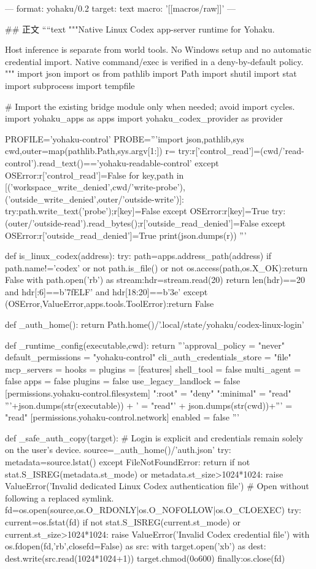 ---
format: yohaku/0.2
target: text
macro: '[[macros/raw]]'
---

## 正文
````text
"""Native Linux Codex app-server runtime for Yohaku.

Host inference is separate from world tools. No Windows setup and no automatic
credential import. Native command/exec is verified in a deny-by-default policy.
"""
import json
import os
from pathlib import Path
import shutil
import stat
import subprocess
import tempfile

# Import the existing bridge module only when needed; avoid import cycles.
import yohaku_apps as apps
import yohaku_codex_provider as provider

PROFILE='yohaku-control'
PROBE='''import json,pathlib,sys
cwd,outer=map(pathlib.Path,sys.argv[1:])
r={}
try:r['control_read']=(cwd/'read-control').read_text()=='yohaku-readable-control'
except OSError:r['control_read']=False
for key,path in [('workspace_write_denied',cwd/'write-probe'),('outside_write_denied',outer/'outside-write')]:
 try:path.write_text('probe');r[key]=False
 except OSError:r[key]=True
try:(outer/'outside-read').read_bytes();r['outside_read_denied']=False
except OSError:r['outside_read_denied']=True
print(json.dumps(r))
'''


def is_linux_codex(address):
    try:
        path=apps.address_path(address)
        if path.name!='codex' or not path.is_file() or not os.access(path,os.X_OK):return False
        with path.open('rb') as stream:hdr=stream.read(20)
        return len(hdr)==20 and hdr[:6]==b'\x7fELF' and hdr[18:20]==b'\x3e'
    except (OSError,ValueError,apps.tools.ToolError):return False


def _auth_home():
    return Path.home()/'.local/state/yohaku/codex-linux-login'


def _runtime_config(executable,cwd):
    return '''approval_policy = "never"
default_permissions = "yohaku-control"
cli_auth_credentials_store = "file"
mcp_servers = {}
hooks = {}
plugins = {}
[features]
shell_tool = false
multi_agent = false
apps = false
plugins = false
use_legacy_landlock = false
[permissions.yohaku-control.filesystem]
":root" = "deny"
":minimal" = "read"
'''+json.dumps(str(executable)) + ' = "read"\n' + json.dumps(str(cwd))+''' = "read"
[permissions.yohaku-control.network]
enabled = false
'''


def _safe_auth_copy(target):
    # Login is explicit and credentials remain solely on the user's device.
    source=_auth_home()/'auth.json'
    try:
        metadata=source.lstat()
    except FileNotFoundError:
        return
    if not stat.S_ISREG(metadata.st_mode) or metadata.st_size>1024*1024:
        raise ValueError('Invalid dedicated Linux Codex authentication file')
    # Open without following a replaced symlink.
    fd=os.open(source,os.O_RDONLY|os.O_NOFOLLOW|os.O_CLOEXEC)
    try:
        current=os.fstat(fd)
        if not stat.S_ISREG(current.st_mode) or current.st_size>1024*1024:
            raise ValueError('Invalid Codex credential file')
        with os.fdopen(fd,'rb',closefd=False) as src:
            with target.open('xb') as dest:
                dest.write(src.read(1024*1024+1))
        target.chmod(0o600)
    finally:os.close(fd)



